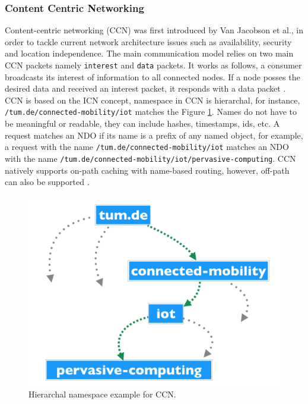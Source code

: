 \subsubsection{Content Centric Networking}
Content-centric networking (CCN) was first introduced by Van Jacobson et al., in order to tackle current network architecture issues such as availability, security and location independence. The main communication model relies on two main CCN packets namely \verb|interest| and \verb|data| packets. It works as follows, a consumer broadcasts its interest of information to all connected nodes. If a node posses the desired data and received an interest packet, it responds with a data packet \cite{Jacobson:2009:NNC:1658939.1658941}.\\

\noindent CCN is  based on the ICN concept, namespace in CCN  is hierarchal, for instance, \verb|/tum.de/connected-mobility/iot| matches the Figure \ref{fig:ccn-namespace}. Names do not have to be meaningful or readable, they can include hashes, timestamps, ids, etc. A request matches an NDO if its name is a prefix of any named object, for example,  a request with the name  \verb|/tum.de/connected-mobility/iot| matches an NDO with the name  \verb|/tum.de/connected-mobility/iot/pervasive-computing|. CCN natively supports on-path caching with name-based routing, however, off-path can also be supported \cite{6563278}.
\begin{figure}[H]
	\centering
	\includegraphics[scale=0.3]{images/namespace.png}
	\caption{Hierarchal namespace example for CCN.}
	\label{fig:ccn-namespace}
\end{figure}

